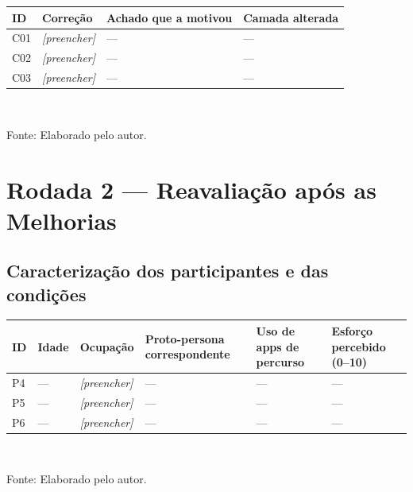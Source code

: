 \begin{quadro}[htb]
\centering
\caption{Correções implementadas entre as rodadas}
\label{quad:res_correcoes}
\footnotesize
\begin{tabular}{p{1.0cm} p{4.6cm} p{4.0cm} p{2.4cm}}
\toprule
\textbf{ID} & \textbf{Correção} & \textbf{Achado que a motivou} &
\textbf{Camada alterada} \\
\midrule
C01 & \textit{[preencher]} & --- & --- \\
C02 & \textit{[preencher]} & --- & --- \\
C03 & \textit{[preencher]} & --- & --- \\
\bottomrule
\end{tabular}
\\[4pt]
\begin{flushleft}
Fonte: Elaborado pelo autor.
\end{flushleft}
\end{quadro}


\section{Rodada 2 --- Reavaliação após as Melhorias}
\label{sec:res_rodada2}


\subsection{Caracterização dos participantes e das condições}

\begin{quadro}[htb]
\centering
\caption{Perfil dos participantes da Rodada 2}
\label{quad:res_perfil_r2}
\footnotesize
\begin{tabular}{p{1.0cm} p{1.0cm} p{2.8cm} p{2.6cm} p{2.4cm} p{2.0cm}}
\toprule
\textbf{ID} & \textbf{Idade} & \textbf{Ocupação} & \textbf{Proto-persona
correspondente} & \textbf{Uso de apps de percurso} & \textbf{Esforço percebido
(0--10)} \\
\midrule
P4 & --- & \textit{[preencher]} & --- & --- & --- \\
P5 & --- & \textit{[preencher]} & --- & --- & --- \\
P6 & --- & \textit{[preencher]} & --- & --- & --- \\
\bottomrule
\end{tabular}
\\[4pt]
\begin{flushleft}
Fonte: Elaborado pelo autor.
\end{flushleft}
\end{quadro}


